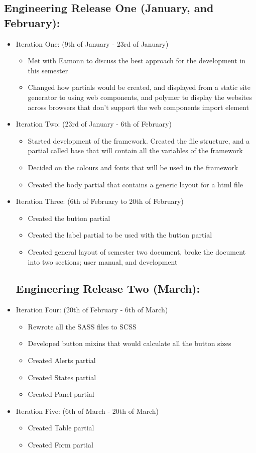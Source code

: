 \subsection{Engineering Release One (January, and February):}
\begin{itemize}
	\item Iteration One: (9th of January - 23rd of January)\begin{itemize} 
	\item Met with Eamonn to discuss the best approach for the development in this semester
	\item Changed how partials would be created, and displayed from a static site generator to using web components, and polymer to display the websites across browsers that don't support the web components import element
	\end{itemize}
	\item Iteration Two: (23rd of January - 6th of February) \begin{itemize}
	\item Started development of the framework. Created the file structure, and a partial called base that will contain all the variables of the framework
	\item Decided on the colours and fonts that will be used in the framework
	\item Created the body partial that contains a generic layout for a html file
	\end{itemize}
	\item Iteration Three: (6th of February to 20th of February)\begin{itemize}
	\item Created the button partial
	\item Created the label partial to be used with the button partial
	\item Created general layout of semester two document, broke the document into two sections; user manual, and development
	\end{itemize}
	\subsection{Engineering Release Two (March):}
		\item Iteration Four: (20th of February - 6th of March)\begin{itemize} 
	\item Rewrote all the SASS files to SCSS
	\item Developed button mixins that would calculate all the button sizes
	\item Created Alerts partial
	\item Created States partial
	\item Created Panel partial
	\end{itemize}
	\item Iteration Five: (6th of March - 20th of March) \begin{itemize}
	\item Created Table partial
	\item Created Form partial
	\end{itemize}

\end{itemize}
